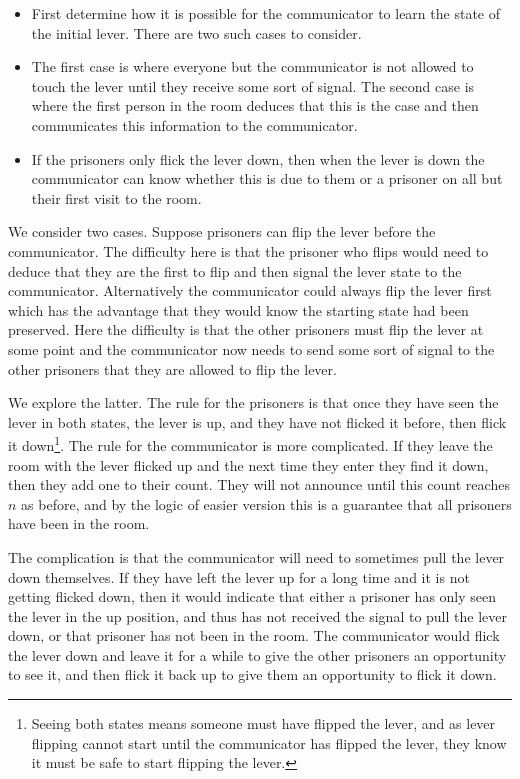 \begin{parts}
	\begin{hints}
		\begin{itemize}
			\item First determine how it is possible for the communicator to learn the state of the initial lever. There are two such cases to consider.
			\item The first case is where everyone but the communicator is not allowed to touch the lever until they receive some sort of signal. The second case is where the first person in the room deduces that this is the case and then communicates this information to the communicator.
			\item If the prisoners only flick the lever down, then when the lever is down the communicator can know whether this is due to them or a prisoner on all but their first visit to the room.
		\end{itemize}
	\end{hints}
	
	\begin{solution}
		
		We consider two cases. Suppose prisoners can flip the lever before the communicator. The difficulty here is that the prisoner who flips would need to deduce that they are the first to flip and then signal the lever state to the communicator. Alternatively the communicator could always flip the lever first which has the advantage that they would know the starting state had been preserved. Here the difficulty is that the other prisoners must flip the lever at some point and the communicator now needs to send some sort of signal to the other prisoners that they are allowed to flip the lever.
		
		We explore the latter. The rule for the prisoners is that once they have seen the lever in both states, the lever is up, and they have not flicked it before, then flick it down\footnote{Seeing both states means someone must have flipped the lever, and as lever flipping cannot start until the communicator has flipped the lever, they know it must be safe to start flipping the lever.}. The rule for the communicator is more complicated. If they leave the room with the lever flicked up and the next time they enter they find it down, then they add one to their count. They will not announce until this count reaches $n$ as before, and by the logic of easier version this is a guarantee that all prisoners have been in the room.
		
		The complication is that the communicator will need to sometimes pull the lever down themselves. If they have left the lever up for a long time and it is not getting flicked down, then it would indicate that either a prisoner has only seen the lever in the up position, and thus has not received the signal to pull the lever down, or that prisoner has not been in the room. The communicator would flick the lever down and leave it for a while to give the other prisoners an opportunity to see it, and then flick it back up to give them an opportunity to flick it down.
		

\end{solution}
\end{parts}
